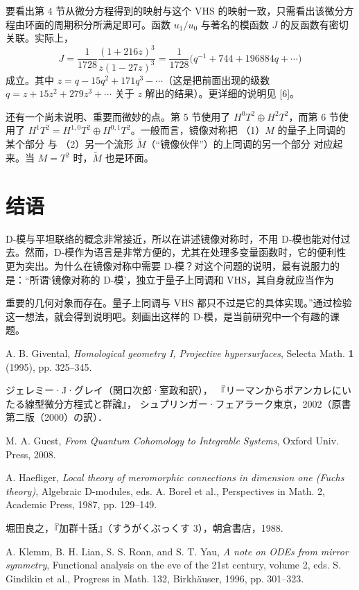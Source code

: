 要看出第 4 节从微分方程得到的映射与这个 VHS 的映射一致，只需看出该微分方程由环面的周期积分所满足即可。函数 $u_1/u_0$ 与著名的模函数 $J$ 的反函数有密切关联。实际上，
\[
J=\frac{1}{1728}\frac{(1+216z)^3}{z(1-27z)^3}
=\frac{1}{1728}\bigl(q^{-1}+744+196884q+\cdots\bigr)
\]
成立。其中 $z=q-15q^2+171q^3-\cdots$（这是把前面出现的级数 $q=z+15z^2+279z^3+\cdots$ 关于 $z$ 解出的结果）。更详细的说明见 [6]。

还有一个尚未说明、重要而微妙的点。第 5 节使用了 $H^0T^2\oplus H^2T^2$，而第 6 节使用了 $H^1T^2=H^{1,0}T^2\oplus H^{0,1}T^2$。一般而言，镜像对称把
（1）$M$ 的量子上同调的某个部分
与
（2）另一个流形 $\widetilde{M}$（“镜像伙伴”）的上同调的另一个部分
对应起来。当 $M=T^2$ 时，$\widetilde{M}$ 也是环面。

\section{结语}

D-模与平坦联络的概念非常接近，所以在讲述镜像对称时，不用 D-模也能对付过去。然而，D-模作为语言是非常方便的，尤其在处理多变量函数时，它的便利性更为突出。为什么在镜像对称中需要 D-模？对这个问题的说明，最有说服力的是：“所谓‘镜像对称的 D-模’，独立于量子上同调和 VHS，其自身就应当作为

重要的几何对象而存在。量子上同调与 VHS 都只不过是它的具体实现。”通过检验这一想法，就会得到说明吧。刻画出这样的 D-模，是当前研究中一个有趣的课题。

\begin{reflist}
  \item[{[1]}] A. B. Givental, \textit{Homological geometry I, Projective hypersurfaces},
    Selecta Math. \textbf{1} (1995), pp. 325--345.
  \item[{[2]}] ジェレミー·J·グレイ（関口次郎·室政和訳），
    『リーマンからポアンカレにいたる線型微分方程式と群論』，
    シュプリンガー·フェアラーク東京，2002（原書第二版（2000）の訳）．
  \item[{[3]}] M. A. Guest, \textit{From Quantum Cohomology to Integrable Systems},
    Oxford Univ. Press, 2008.
  \item[{[4]}] A. Haefliger, \textit{Local theory of meromorphic connections in dimension one (Fuchs theory)},
    Algebraic D-modules, eds. A. Borel et al., Perspectives in Math. 2, Academic Press, 1987, pp. 129--149.
  \item[{[5]}] 堀田良之，『加群十話』（すうがくぶっくす 3），朝倉書店，1988.
  \item[{[6]}] A. Klemm, B. H. Lian, S. S. Roan, and S. T. Yau,
    \textit{A note on ODEs from mirror symmetry},
    Functional analysis on the eve of the 21st century, volume 2, eds. S. Gindikin et al.,
    Progress in Math. 132, Birkh\"auser, 1996, pp. 301--323.
\end{reflist}

\begin{flushright}
\end{flushright}


\renewcommand{\thesection}{\Roman{section}}